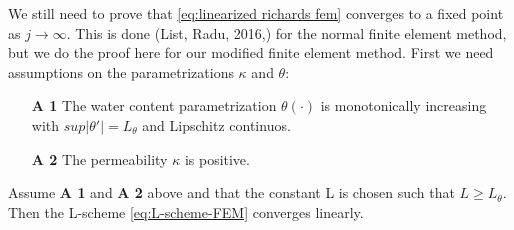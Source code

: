 \documentclass[../Main/main.tex]{subfiles}
\begin{document}
	
	We still need to prove that \eqref{eq:linearized richards fem} converges to a fixed point as $j\rightarrow \infty$. This is done (List, Radu, 2016,\cite{list2016study}) for the normal finite element method, but we do the proof here for our modified finite element method. 
	First we need assumptions on the parametrizations $\kappa $ and $\theta$:
	\begin{itemize}
		\item[\textbf{A 1}] The water content parametrization $\theta(\cdot)$ is monotonically increasing with $sup|\theta'| = L_{\theta}$ and Lipschitz continuos.
		\item[\textbf{A 2}] The permeability $\kappa$ is positive. 
	\end{itemize}
	\begin{theorem}
		Assume \textbf{A 1} and \textbf{A 2} above and that the constant L is chosen such that $L \geq L_{\theta}$. Then the L-scheme \eqref{eq:L-scheme-FEM} converges linearly. 
	\end{theorem}
\end{document}
